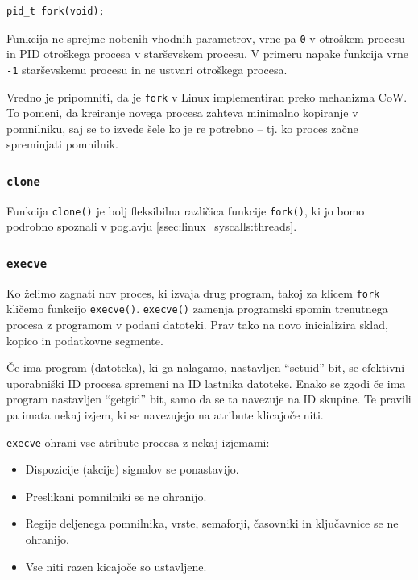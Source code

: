 \documentclass[a4paper,12pt,openright]{book}
\begin{document}
\begin{lstlisting}[style=func]
 pid_t fork(void);
\end{lstlisting}

Funkcija ne sprejme nobenih vhodnih parametrov, vrne pa \texttt{0} v otroškem procesu in PID otroškega procesa v starševskem procesu.
V primeru napake funkcija vrne \texttt{-1} starševskemu procesu in ne ustvari otroškega procesa.

Vredno je pripomniti, da je \texttt{fork} v Linux implementiran preko mehanizma CoW.
To pomeni, da kreiranje novega procesa zahteva minimalno kopiranje v pomnilniku, saj se to izvede šele ko je re potrebno -- tj. ko proces začne spreminjati pomnilnik.

\subsubsection{\texttt{clone}}

Funkcija \texttt{clone()} je bolj fleksibilna različica funkcije \texttt{fork()}, ki jo bomo podrobno spoznali v poglavju \ref{ssec:linux_syscalls:threads}.

\subsubsection{\texttt{execve}}

Ko želimo zagnati nov proces, ki izvaja drug program, takoj za klicem \texttt{fork} kličemo funkcijo \texttt{execve()}.
\texttt{execve()} zamenja programski spomin trenutnega procesa z programom v podani datoteki.
Prav tako na novo inicializira sklad, kopico in podatkovne segmente.

Če ima program (datoteka), ki ga nalagamo, nastavljen ``setuid'' bit, se efektivni uporabniški ID procesa spremeni na ID lastnika datoteke.
Enako se zgodi če ima program nastavljen ``getgid'' bit, samo da se ta navezuje na ID skupine.
Te pravili pa imata nekaj izjem, ki se navezujejo na atribute klicajoče niti.

\texttt{execve} ohrani vse atribute procesa z nekaj izjemami:
\begin{itemize}
	\item Dispozicije (akcije) signalov se ponastavijo.
	\item Preslikani pomnilniki se ne ohranijo.
	\item Regije deljenega pomnilnika, vrste, semaforji, časovniki in ključavnice se ne ohranijo.
	\item Vse niti razen kicajoče so ustavljene.
\end{itemize}
\end{document}
